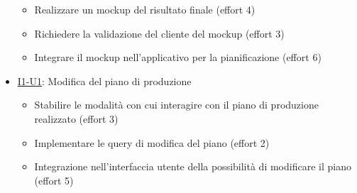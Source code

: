 \begin{itemize}
        \begin{itemize}
          \item Realizzare un mockup del risultato finale (effort 4)
          \item Richiedere la validazione del cliente del mockup (effort 3)
          \item Integrare il mockup nell'applicativo per la pianificazione (effort 6)
        \end{itemize}
  \item \href{}{I1-U1}: Modifica del piano di produzione
        \begin{itemize}
          \item Stabilire le modalità con cui interagire con il piano di produzione realizzato (effort 3)
          \item Implementare le query di modifica del piano (effort 2)
          \item Integrazione nell'interfaccia utente della possibilità di modificare il piano (effort 5)
        \end{itemize}
\end{itemize}
